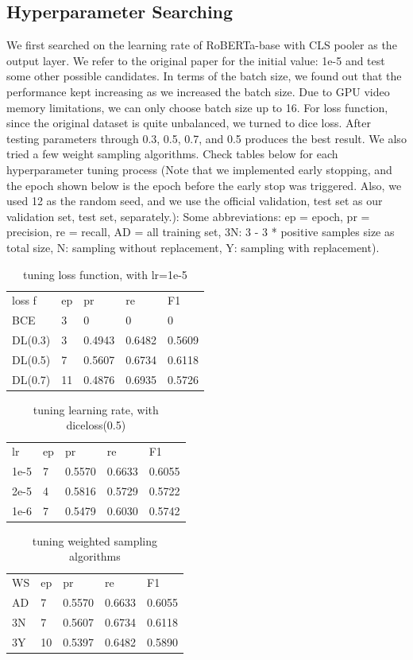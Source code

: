 \documentclass[11pt,a4paper]{article}
\begin{document}
\subsection{Hyperparameter Searching}
We first searched on the learning rate of RoBERTa-base with CLS pooler as the output layer\cite{liu2019roberta}. We refer to the original paper for the initial value: 1e-5 and test some other possible candidates. In terms of the batch size, we found out that the performance kept increasing as we increased the batch size. Due to GPU video memory limitations, we can only choose batch size up to 16. For loss function, since the original dataset is quite unbalanced, we turned to dice loss\cite{li2020dice}. After testing parameters through 0.3, 0.5, 0.7, and 0.5 produces the best result. We also tried a few weight sampling algorithms. Check tables below for each hyperparameter tuning process (Note that we implemented early stopping, and the epoch shown below is the epoch before the early stop was triggered. Also, we used 12 as the random seed, and we use the official validation, test set as our validation set, test set, separately.):
Some abbreviations: ep = epoch, pr = precision, re = recall, AD = all training set, 3N: 3 - 3 * positive samples size as total size, N: sampling without replacement, Y: sampling with replacement).

\begin{table}[h!]
\begin{tabular}{lllll}
loss f  & ep & pr     & re     & F1     \\
BCE     & 3  & 0      & 0      & 0      \\
DL(0.3) & 3  & 0.4943 & 0.6482 & 0.5609 \\
DL(0.5) & 7  & 0.5607 & 0.6734 & 0.6118 \\
DL(0.7) & 11 & 0.4876 & 0.6935 & 0.5726
\end{tabular}
\caption{tuning loss function, with lr=1e-5}
\end{table}
\begin{table}[h!]
\begin{tabular}{lllll}
lr   & ep & pr     & re     & F1     \\
1e-5 & 7  & 0.5570 & 0.6633 & 0.6055 \\
2e-5 & 4  & 0.5816 & 0.5729 & 0.5722 \\
1e-6 & 7  & 0.5479 & 0.6030 & 0.5742
\end{tabular}
\caption{tuning learning rate, with diceloss(0.5)}
\end{table}
\begin{table}[h!]
\begin{tabular}{lllll}
WS & ep & pr     & re     & F1     \\
AD & 7  & 0.5570 & 0.6633 & 0.6055 \\
3N & 7  & 0.5607 & 0.6734 & 0.6118 \\
3Y & 10 & 0.5397 & 0.6482 & 0.5890
\end{tabular}
\caption{tuning weighted sampling algorithms}
\end{table}
\end{document}
